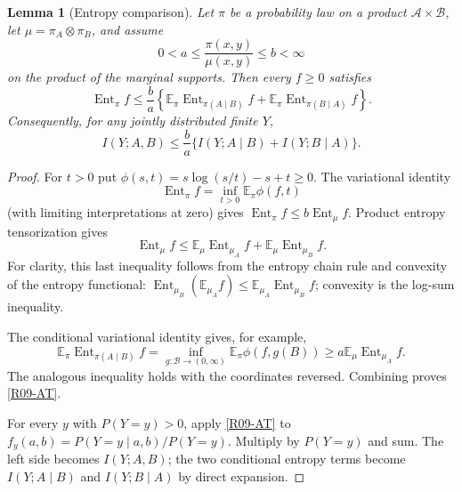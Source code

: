 \documentclass[11pt,a4paper]{article}
\newtheorem{lemma}[theorem]{Lemma}
\theoremstyle{definition}\newtheorem{definition}[theorem]{Definition}
\theoremstyle{remark}\newtheorem{remark}[theorem]{Remark}
\newcommand{\E}{\mathbb E}\newcommand{\one}{\mathbf 1}\newcommand{\1}{\mathbf 1}
\numberwithin{equation}{section}
\begin{document}
\begin{lemma}[Entropy comparison]\label{R09-comparison}
Let $\pi$ be a probability law on a product $\mathcal A\times\mathcal B$, let $\mu=\pi_A\otimes\pi_B$, and assume
\[
 0<a\le\frac{\pi(x,y)}{\mu(x,y)}\le b<\infty
\]
on the product of the marginal supports. Then every $f\ge0$ satisfies
\begin{equation}\label{R09-AT}
 \operatorname{Ent}_\pi f\le\frac ba\left\{
 \E_\pi\operatorname{Ent}_{\pi(A\mid B)}f+
 \E_\pi\operatorname{Ent}_{\pi(B\mid A)}f\right\}.
\end{equation}
Consequently, for any jointly distributed finite $Y$,
\begin{equation}\label{R09-QI}
 I(Y;A,B)\le\frac ba\{I(Y;A\mid B)+I(Y;B\mid A)\}.
\end{equation}
\end{lemma}
\begin{proof}
For $t>0$ put $\phi(s,t)=s\log(s/t)-s+t\ge0$. The variational identity
\[
 \operatorname{Ent}_\pi f=\inf_{t>0}\E_\pi\phi(f,t)
\]
(with limiting interpretations at zero) gives $\operatorname{Ent}_\pi f\le b\operatorname{Ent}_\mu f$. Product entropy tensorization gives
\[
 \operatorname{Ent}_\mu f\le
 \E_\mu\operatorname{Ent}_{\mu_A}f+
 \E_\mu\operatorname{Ent}_{\mu_B}f.
\]
For clarity, this last inequality follows from the entropy chain rule and convexity of the entropy functional: $\operatorname{Ent}_{\mu_B}(\E_{\mu_A}f)\le\E_{\mu_A}\operatorname{Ent}_{\mu_B}f$; convexity is the log-sum inequality.

The conditional variational identity gives, for example,
\[
 \E_\pi\operatorname{Ent}_{\pi(A\mid B)}f
 =\inf_{g:\mathcal B\to(0,\infty)}\E_\pi\phi(f,g(B))
 \ge a\E_\mu\operatorname{Ent}_{\mu_A}f.
\]
The analogous inequality holds with the coordinates reversed. Combining proves \eqref{R09-AT}.

For every $y$ with $P(Y=y)>0$, apply \eqref{R09-AT} to
$f_y(a,b)=P(Y=y\mid a,b)/P(Y=y)$. Multiply by $P(Y=y)$ and sum. The left side becomes $I(Y;A,B)$; the two conditional entropy terms become $I(Y;A\mid B)$ and $I(Y;B\mid A)$ by direct expansion.
\end{proof}
\end{document}
